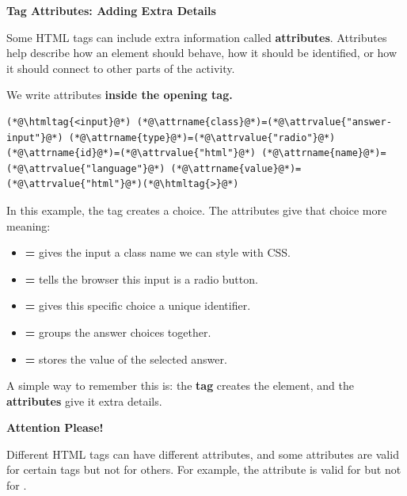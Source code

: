 \documentclass{article}
\begin{document}
\textbf{\Bitter\textcolor{naranja}{Tag Attributes: Adding Extra Details}}

\vspace{0.1cm}

Some HTML tags can include extra information called \textbf{attributes}.
Attributes help describe how an element should behave, how it should be identified, or how it should connect to other parts of the activity.

We write attributes \textbf{inside the opening tag.}

\vspace{0.2cm}

\begin{lstlisting}
(*@\htmltag{<input}@*) (*@\attrname{class}@*)=(*@\attrvalue{"answer-input"}@*) (*@\attrname{type}@*)=(*@\attrvalue{"radio"}@*) (*@\attrname{id}@*)=(*@\attrvalue{"html"}@*) (*@\attrname{name}@*)=(*@\attrvalue{"language"}@*) (*@\attrname{value}@*)=(*@\attrvalue{"html"}@*)(*@\htmltag{>}@*)
\end{lstlisting}

In this example, the  tag creates a choice.
The attributes give that choice more meaning:

\begin{itemize}[leftmargin=1.2cm, itemsep=4pt]
  \item \textbf{=} gives the input a class name we can style with CSS.
  \item \textbf{=} tells the browser this input is a radio button.
  \item \textbf{=} gives this specific choice a unique identifier.
  \item \textbf{=} groups the answer choices together.
  \item \textbf{=} stores the value of the selected answer.
\end{itemize}

A simple way to remember this is: the \textbf{tag} creates the element, and the \textbf{attributes} give it extra details.

\begin{attentionbox}
  \textbf{\Bitter\textcolor{naranja}{Attention Please!}}

  Different HTML tags can have different attributes, and some attributes are valid for certain tags but not for
  others. For example, the  attribute is valid for 
  but not for .
\end{attentionbox}
\end{document}
